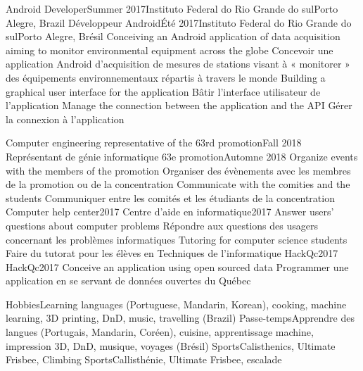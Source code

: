     \resumeSubheadingEnFr
      {Android Developer}{Summer 2017}{Instituto Federal do Rio Grande do sul}{Porto Alegre, Brazil}
      {Développeur Android}{Été 2017}{Instituto Federal do Rio Grande do sul}{Porto Alegre, Brésil}
            \resumeItemListStart
                \resumeItemEnFr
                    {Conceiving an Android application of data acquisition aiming to monitor environmental equipment across the globe}
                    {Concevoir une application Android d’acquisition de mesures de stations visant à   « monitorer » des équipements environnementaux répartis à travers le monde}
                \resumeItemEnFr
                    {Building a graphical user interface for the application}
                    {Bâtir l’interface utilisateur de l’application}
                \resumeItemEnFr
                    {Manage the connection between the application and the API}
                    {Gérer la connexion à l’application}
            \resumeItemListEnd
    \resumeSubHeadingListEnd

    \resumeSubHeadingListStart
      \resumeProjectHeadingEnFr
          {Computer engineering representative of the 63rd promotion}{Fall 2018}
          {Représentant de génie informatique 63e promotion}{Automne 2018}
            \resumeItemListStart
                \resumeItemEnFr
                    {Organize events with the members of the promotion}
                    {Organiser des évènements avec les membres de la promotion ou de la concentration}
                \resumeItemEnFr
                    {Communicate with the comities and the students}
                    {Communiquer entre les comités et les étudiants de la concentration}
            \resumeItemListEnd
      \resumeProjectHeadingEnFr
          {Computer help center}{2017}
          {Centre d’aide en informatique}{2017}
            \resumeItemListStart
                \resumeItemEnFr
                    {Answer users' questions about computer problems}
                    {Répondre aux questions des usagers concernant les problèmes informatiques}
                \resumeItemEnFr
                    {Tutoring for computer science students}
                    {Faire du tutorat pour les élèves en Techniques de l'informatique}
            \resumeItemListEnd
      \resumeProjectHeadingEnFr
          {HackQc}{2017}
          {HackQc}{2017}
            \resumeItemListStart
                \resumeItemEnFr
                    {Conceive an application using open sourced data}
                    {Programmer une application en se servant de données ouvertes du Québec}
            \resumeItemListEnd
    \resumeSubHeadingListEnd
  
  
    \resumeSubHeadingListStart
        \resumeSubheadingEnFr
            {Hobbies}{}{Learning languages (Portuguese, Mandarin, Korean), cooking, machine learning, 3D printing, DnD, music, travelling (Brazil)}{}
            {Passe-temps}{}{Apprendre des langues (Portugais, Mandarin, Coréen), cuisine, apprentissage machine, impression 3D, DnD, musique, voyages (Brésil)}{}
        \resumeSubheadingEnFr
            {Sports}{}{Calisthenics, Ultimate Frisbee, Climbing}{}
            {Sports}{}{Callisthénie, Ultimate Frisbee, escalade}{}
    \resumeSubHeadingListEnd
